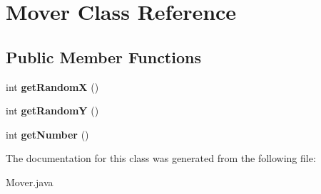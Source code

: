 \section{Mover Class Reference}
\label{class_mover}
\subsection*{Public Member Functions}
\begin{DoxyCompactItemize}
\item 
\mbox{\label{class_mover_aa8463e1dbfe8116c0f1734741fb35ff2}} 
int {\bfseries get\+RandomX} ()
\item 
\mbox{\label{class_mover_a20e4b8cb3b50ff680d9aca7c4ccccd2d}} 
int {\bfseries get\+RandomY} ()
\item 
\mbox{\label{class_mover_aabe24907cf6de3da4959c45d30662042}} 
int {\bfseries get\+Number} ()
\end{DoxyCompactItemize}


The documentation for this class was generated from the following file\+:\begin{DoxyCompactItemize}
\item 
Mover.\+java\end{DoxyCompactItemize}
